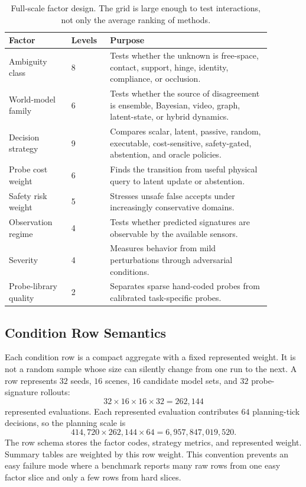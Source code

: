 \documentclass{article}
\begin{document}
\begin{table}[t]
\centering
\small
\begin{tabular}{p{0.21\linewidth}p{0.13\linewidth}p{0.54\linewidth}}
\toprule
Factor & Levels & Purpose \\
\midrule
Ambiguity class & 8 & Tests whether the unknown is free-space, contact, support, hinge, identity, compliance, or occlusion. \\
World-model family & 6 & Tests whether the source of disagreement is ensemble, Bayesian, video, graph, latent-state, or hybrid dynamics. \\
Decision strategy & 9 & Compares scalar, latent, passive, random, executable, cost-sensitive, safety-gated, abstention, and oracle policies. \\
Probe cost weight & 6 & Finds the transition from useful physical query to latent update or abstention. \\
Safety risk weight & 5 & Stresses unsafe false accepts under increasingly conservative domains. \\
Observation regime & 4 & Tests whether predicted signatures are observable by the available sensors. \\
Severity & 4 & Measures behavior from mild perturbations through adversarial conditions. \\
Probe-library quality & 2 & Separates sparse hand-coded probes from calibrated task-specific probes. \\
\bottomrule
\end{tabular}
\caption{Full-scale factor design. The grid is large enough to test interactions, not only the average ranking of methods.}
\label{tab:factor_design}
\end{table}

\subsection{Condition Row Semantics}

Each condition row is a compact aggregate with a fixed represented weight. It is not a random sample whose size can silently change from one run to the next. A row represents $32$ seeds, $16$ scenes, $16$ candidate model sets, and $32$ probe-signature rollouts:
\[
    32 \times 16 \times 16 \times 32 = 262{,}144
\]
represented evaluations. Each represented evaluation contributes $64$ planning-tick decisions, so the planning scale is
\[
    414{,}720 \times 262{,}144 \times 64
    = 6{,}957{,}847{,}019{,}520.
\]
The row schema stores the factor codes, strategy metrics, and represented weight. Summary tables are weighted by this row weight. This convention prevents an easy failure mode where a benchmark reports many raw rows from one easy factor slice and only a few rows from hard slices.
\end{document}
